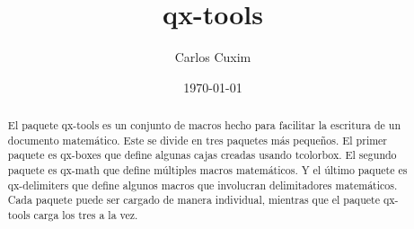 \documentclass[11pt]{article}
\title{\textsf{qx-tools}}
\author{Carlos Cuxim}
\date{\today}
\begin{document}
\maketitle

\begin{abstract}
  El paquete \textsf{qx-tools} es un conjunto de macros hecho para facilitar la escritura de un documento matemático. Este se divide en tres paquetes más pequeños. El primer paquete es \textsf{qx-boxes} que define algunas cajas creadas usando \textsf{tcolorbox}. El segundo paquete es \textsf{qx-math} que define múltiples macros matemáticos. Y el último paquete es \textsf{qx-delimiters} que define algunos macros que involucran delimitadores matemáticos. Cada paquete puede ser cargado de manera individual, mientras que el paquete \textsf{qx-tools} carga los tres a la vez.
\end{abstract}
\end{document}
